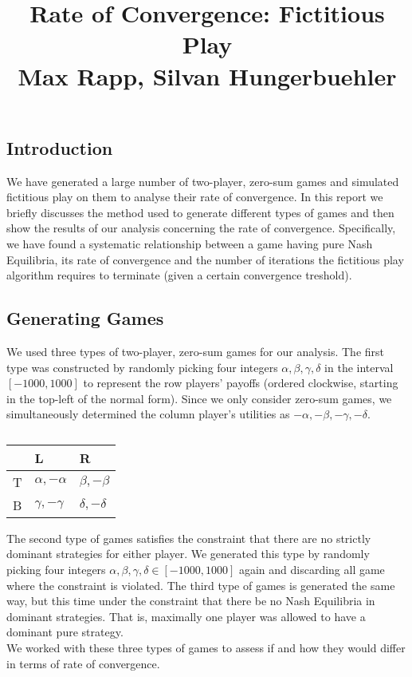 \documentclass[10pt,a4paper]{article}
\title{%
  Rate of Convergence: Fictitious Play \\
  \large Max Rapp, Silvan Hungerbuehler}
\date{}
\begin{document}
\maketitle

\subsection*{Introduction}
We have generated a large number of two-player, zero-sum games and simulated fictitious play on them to analyse their rate of convergence. 
In this report we briefly discusses the method used to generate different types of games and then show the results of our analysis concerning the rate of convergence. Specifically, we have found a systematic relationship between a game having pure Nash Equilibria, its rate of convergence and the number of iterations the fictitious play algorithm requires to terminate (given a certain convergence treshold).
\subsection*{Generating Games}
We used three types of two-player, zero-sum games for our analysis. The first type was constructed by randomly picking four integers  $\alpha,\beta,\gamma,\delta$ in the interval $[-1000,1000]$ to represent the row players' payoffs (ordered clockwise, starting in the top-left of the normal form). Since we only consider zero-sum games, we simultaneously determined the column player's utilities as $-\alpha,-\beta,-\gamma,-\delta$.
\begin{table}[h]
\centering
\caption{}
\begin{tabular}{|l|l|l|}
\hline
  & L                & R                \\ \hline
T & $\alpha,-\alpha$ & $\beta,-\beta$   \\ \hline
B & $\gamma,-\gamma$ & $\delta,-\delta$ \\ \hline
\end{tabular}
\end{table}

The second type of games satisfies the constraint that there are no strictly dominant strategies for either player. We generated this type by randomly picking four integers $\alpha,\beta,\gamma,\delta \in [-1000,1000]$ again and discarding all game where the constraint is violated. The third type of games is generated the same way, but this time under the constraint that there be no Nash Equilibria in dominant strategies. That is, maximally one player was allowed to have a dominant pure strategy.\\
We worked with these three types of games to assess if and how they would differ in terms of rate of convergence.
\end{document}

